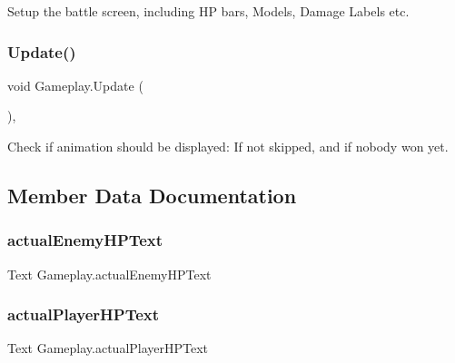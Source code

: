 Setup the battle screen, including HP bars, Models, Damage Labels etc. 

\mbox{\label{class_gameplay_a0b4601bd58b54a27d9c4d3c6c9b72d8c}} 
\subsubsection{\texorpdfstring{Update()}{Update()}}
{\footnotesize\ttfamily void Gameplay.\+Update (\begin{DoxyParamCaption}{ }\end{DoxyParamCaption})\hspace{0.3cm}{\ttfamily [inline]}, {\ttfamily [private]}}



Check if animation should be displayed\+: If not skipped, and if nobody won yet. 



\subsection{Member Data Documentation}
\mbox{\label{class_gameplay_af744284896199a16b0fa180dc271f2e6}} 
\subsubsection{\texorpdfstring{actualEnemyHPText}{actualEnemyHPText}}
{\footnotesize\ttfamily Text Gameplay.\+actual\+Enemy\+H\+P\+Text\hspace{0.3cm}{\ttfamily [private]}}

\mbox{\label{class_gameplay_add500df8b9f20ace05c1fd087f4d8911}} 
\subsubsection{\texorpdfstring{actualPlayerHPText}{actualPlayerHPText}}
{\footnotesize\ttfamily Text Gameplay.\+actual\+Player\+H\+P\+Text}

\mbox{\label{class_gameplay_a8ad8fc709889c1581412a46b5c648f2e}} 
